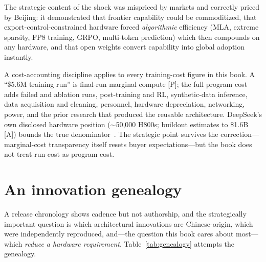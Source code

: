 The strategic content of the shock was mispriced by markets and correctly priced by Beijing: it demonstrated that frontier capability could be commoditized, that export-control-constrained hardware forced \emph{algorithmic} efficiency (MLA, extreme sparsity, FP8 training, GRPO, multi-token prediction) which then compounds on any hardware, and that open weights convert capability into global adoption instantly.

A cost-accounting discipline applies to every training-cost figure in this book. A ``\$5.6M training run'' is final-run marginal compute [P]; the full program cost adds failed and ablation runs, post-training and RL, synthetic-data inference, data acquisition and cleaning, personnel, hardware depreciation, networking, power, and the prior research that produced the reusable architecture. DeepSeek's own disclosed hardware position ($\sim$50,000 H800s; buildout estimates to \$1.6B [A]) bounds the true denominator~\cite{deepseek-v3}. The strategic point survives the correction---marginal-cost transparency itself resets buyer expectations---but the book does not treat run cost as program cost.

\section{An innovation genealogy}
\label{sec:genealogy}

A release chronology shows cadence but not authorship, and the strategically important question is which architectural innovations are Chinese-origin, which were independently reproduced, and---the question this book cares about most---which \emph{reduce a hardware requirement}. Table~\ref{tab:genealogy} attempts the genealogy.

